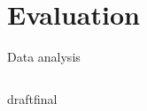 \documentclass{beamer}
\def\final{final}
\def\status{draft}
\begin{document}
\section{Evaluation}
\begin{frame}{Data analysis}
  \vspace{-0.2cm}
  \begin{columns}[totalwidth=\textwidth]
    \begin{column}{\textwidth}
      \begin{table}
        \caption{\footnotesize Number of subflows per MPTCP connection, \textcolor{uos-grey-full}{Source:\cite{realMPTCP}}}
      \end{table}
    \end{column}
  \end{columns}

  \ifx\status\final{}
    \pause{}
  \fi


\end{frame}
\end{document}
